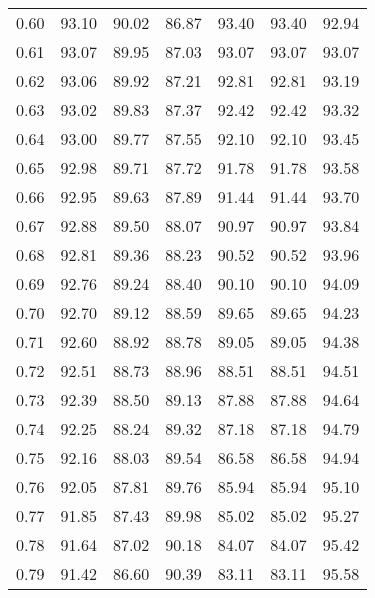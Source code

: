 \begin{tabular}{|c|c|c|c|c|c|c|}
      0.60 &     93.10 &     90.02 &      86.87 &   93.40 &      93.40 &         92.94 \\
      0.61 &     93.07 &     89.95 &      87.03 &   93.07 &      93.07 &         93.07 \\
      0.62 &     93.06 &     89.92 &      87.21 &   92.81 &      92.81 &         93.19 \\
      0.63 &     93.02 &     89.83 &      87.37 &   92.42 &      92.42 &         93.32 \\
      0.64 &     93.00 &     89.77 &      87.55 &   92.10 &      92.10 &         93.45 \\
      0.65 &     92.98 &     89.71 &      87.72 &   91.78 &      91.78 &         93.58 \\
      0.66 &     92.95 &     89.63 &      87.89 &   91.44 &      91.44 &         93.70 \\
      0.67 &     92.88 &     89.50 &      88.07 &   90.97 &      90.97 &         93.84 \\
      0.68 &     92.81 &     89.36 &      88.23 &   90.52 &      90.52 &         93.96 \\
      0.69 &     92.76 &     89.24 &      88.40 &   90.10 &      90.10 &         94.09 \\
      0.70 &     92.70 &     89.12 &      88.59 &   89.65 &      89.65 &         94.23 \\
      0.71 &     92.60 &     88.92 &      88.78 &   89.05 &      89.05 &         94.38 \\
      0.72 &     92.51 &     88.73 &      88.96 &   88.51 &      88.51 &         94.51 \\
      0.73 &     92.39 &     88.50 &      89.13 &   87.88 &      87.88 &         94.64 \\
      0.74 &     92.25 &     88.24 &      89.32 &   87.18 &      87.18 &         94.79 \\
      0.75 &     92.16 &     88.03 &      89.54 &   86.58 &      86.58 &         94.94 \\
      0.76 &     92.05 &     87.81 &      89.76 &   85.94 &      85.94 &         95.10 \\
      0.77 &     91.85 &     87.43 &      89.98 &   85.02 &      85.02 &         95.27 \\
      0.78 &     91.64 &     87.02 &      90.18 &   84.07 &      84.07 &         95.42 \\
      0.79 &     91.42 &     86.60 &      90.39 &   83.11 &      83.11 &         95.58 \\

\end{tabular}
